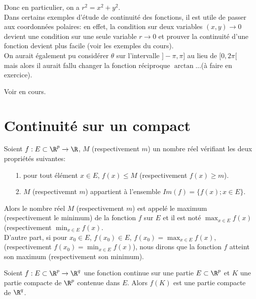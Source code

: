 \documentclass[class=report,crop=false]{standalone}
\begin{document}
\noindent Donc en particulier, on a $r^2=x^2+y^2$. \\
Dans certains exemples d'étude de  continuité des fonctions, il est utile de passer aux coordonnées
polaires: en effet, la condition sur deux variables $(x,y) \rightarrow 0$ devient une condition
sur une seule variable $r \rightarrow 0$ et prouver la continuité d'une fonction devient plus facile (voir les exemples du cours).\\
On aurait également pu considérer $\theta$ sur l'intervalle $]-\pi, \pi]$ au lieu de $[0, 2\pi[ $ mais alors il aurait fallu changer la fonction réciproque $\arctan$...(à faire en exercice).

\begin{exemple} \textcolor[rgb]{0.00,0.59,0.00}
{Voir en cours.
}
\end{exemple}

\section{Continuité sur un compact}

\begin{definition}
\textcolor[rgb]{0.73,0.00,0.00}{
\noindent Soient $f: E \subset  \R ^p\rightarrow \R$, $M$ (respectivement $m$) un nombre réel vérifiant les deux propriétés suivantes:
\begin{itemize}
\item[1.] pour tout élément $x \in E$, $f(x) \leq M$ (respectivement $f(x) \geq m$).
\item[2.] $M$ (respectivemnt $m$) appartient à l'ensemble $Im (f )=\lbrace f(x); x\in E \rbrace$.
\end{itemize}
Alors le nombre réel $M$ (respectivement $m$) est appelé le maximum (respectivement le minimum) de la fonction $f$ sur $E$ et il est noté $\displaystyle \max_{x \in E} f(x)$ (respectivement $\displaystyle \min_{x \in E} f(x)$.\\
D'autre part, si pour $x_0 \in E$, $f(x_0) \in E$, $f(x_0)= \displaystyle \max_{x \in E} f(x)$, 
(respectivement $f(x_0)= \displaystyle \min_{x \in E} f(x)$), nous dirons que la fonction $f$
atteint son maximum (respectivement son minimum).
}
\end{definition}

\begin{theoreme}
\textcolor[rgb]{0.50,0.00,0.25}{
Soient $f:E \subset \R^p \rightarrow \R^q$ une fonction continue sur une partie $E \subset \R^p$
et $K$ une partie compacte de $\R^p$ contenue dans $E$. Alors $f(K)$ est une partie compacte
de $\R^q$.
}
\end{theoreme}
\end{document}
